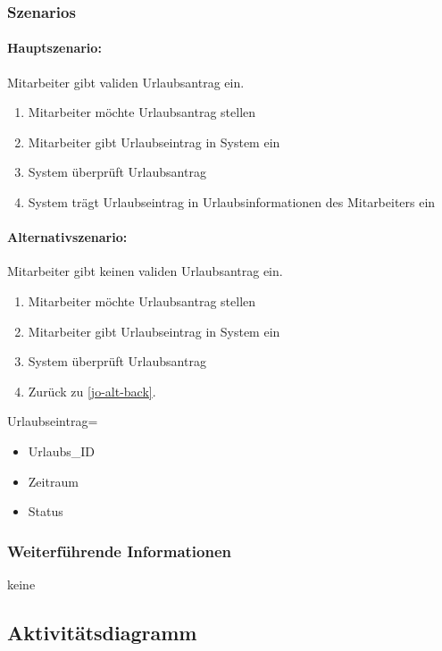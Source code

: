 \subsubsection{Szenarios}

\paragraph{Hauptszenario:} Mitarbeiter gibt validen Urlaubsantrag ein.
\begin{enumerate}
\item Mitarbeiter möchte Urlaubsantrag stellen
\item Mitarbeiter gibt Urlaubseintrag in System ein
\item System überprüft Urlaubsantrag
\item System trägt Urlaubseintrag in Urlaubsinformationen des Mitarbeiters ein
\end{enumerate}

\paragraph{Alternativszenario:} Mitarbeiter gibt keinen validen Urlaubsantrag ein.
\begin{enumerate}
\item Mitarbeiter möchte Urlaubsantrag stellen
\item Mitarbeiter gibt Urlaubseintrag in System ein \label{jo-alt-back}
\item System überprüft Urlaubsantrag
\item Zurück zu \ref{jo-alt-back}.
\end{enumerate}

Urlaubseintrag=
\begin{itemize}[label=+]
\item[] Urlaubs\_ID
\item Zeitraum
\item Status
\end{itemize}

\subsubsection{Weiterführende Informationen}
keine

\subsection{Aktivitätsdiagramm}

